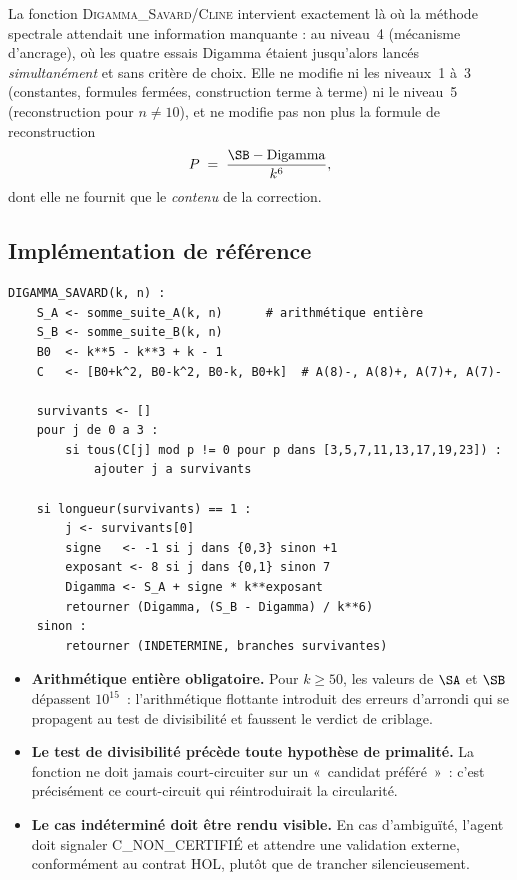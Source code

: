 \begin{boitenote}
La fonction \textsc{Digamma\_Savard/Cline} intervient exactement là où la
méthode spectrale attendait une information manquante : au niveau~4
(mécanisme d'ancrage), où les quatre essais Digamma étaient jusqu'alors
lancés \emph{simultanément} et sans critère de choix. Elle ne modifie
ni les niveaux~1 à~3 (constantes, formules fermées, construction
terme à terme) ni le niveau~5 (reconstruction pour $n \neq 10$), et ne
modifie pas non plus la formule de reconstruction
\[
  P \;=\; \frac{\SB - \mathrm{Digamma}}{k^{6}},
\]
dont elle ne fournit que le \emph{contenu} de la correction.
\end{boitenote}


\subsection{Implémentation de référence}

\begin{boitenote}
\begin{Verbatim}[frame=single,fontsize=\footnotesize]
DIGAMMA_SAVARD(k, n) :
    S_A <- somme_suite_A(k, n)      # arithmétique entière
    S_B <- somme_suite_B(k, n)
    B0  <- k**5 - k**3 + k - 1
    C   <- [B0+k^2, B0-k^2, B0-k, B0+k]  # A(8)-, A(8)+, A(7)+, A(7)-

    survivants <- []
    pour j de 0 a 3 :
        si tous(C[j] mod p != 0 pour p dans [3,5,7,11,13,17,19,23]) :
            ajouter j a survivants

    si longueur(survivants) == 1 :
        j <- survivants[0]
        signe   <- -1 si j dans {0,3} sinon +1
        exposant <- 8 si j dans {0,1} sinon 7
        Digamma <- S_A + signe * k**exposant
        retourner (Digamma, (S_B - Digamma) / k**6)
    sinon :
        retourner (INDETERMINE, branches survivantes)
\end{Verbatim}
\end{boitenote}

\begin{boitenote}
\begin{itemize}[nosep]
  \item \textbf{Arithmétique entière obligatoire.} Pour $k \ge 50$, les
    valeurs de $\SA$ et $\SB$ dépassent $10^{15}$~: l'arithmétique
    flottante introduit des erreurs d'arrondi qui se propagent au
    test de divisibilité et faussent le verdict de criblage.
  \item \textbf{Le test de divisibilité précède toute hypothèse de
    primalité.} La fonction ne doit jamais court-circuiter sur un
    «~candidat préféré~»~: c'est précisément ce court-circuit qui
    réintroduirait la circularité.
  \item \textbf{Le cas indéterminé doit être rendu visible.} En cas
    d'ambiguïté, l'agent doit signaler \textsc{C\_NON\_CERTIFIÉ} et
    attendre une validation externe, conformément au contrat HOL,
    plutôt que de trancher silencieusement.
\end{itemize}
\end{boitenote}


